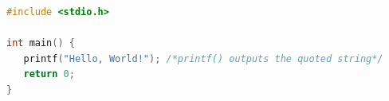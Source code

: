
\begin{lstlisting}[caption={Code Example}, label={lst:codeExample}, language=C]
#include <stdio.h>

int main() {
   printf("Hello, World!"); /*printf() outputs the quoted string*/
   return 0;
}
\end{lstlisting}
